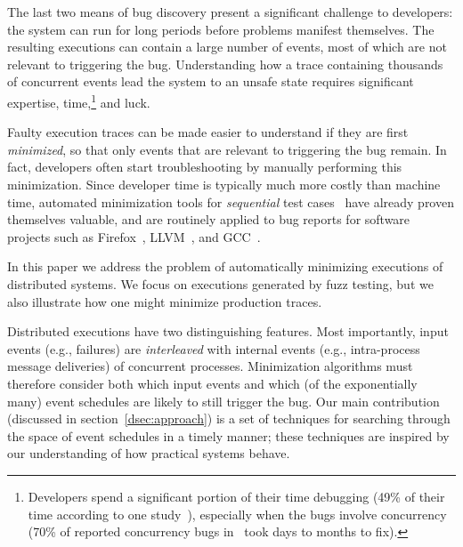 The last two means of bug discovery present a significant challenge to
developers: the system can run for
long periods before problems manifest themselves. The resulting executions
can contain a large number of events, most of which are not relevant to triggering the
bug. Understanding how a trace containing thousands of concurrent events lead
the system to an unsafe state requires significant expertise, time,\footnote{Developers spend a significant portion of their time
debugging (49\% of their time according to one
study~\cite{LaToza:2006:MMM:1134285.1134355}), especially when the bugs
involve concurrency (70\% of reported concurrency bugs
in~\cite{msoft_concurrency} took days to months to fix).}
and luck.


Faulty execution traces can be made %
easier to understand if they are first
{\em minimized}, so that only events that are relevant to triggering the bug remain.
In fact, developers often start troubleshooting by manually performing this minimization.
Since developer time is typically much more costly than machine time,
automated minimization tools for {\em sequential}
test
cases~\cite{claessen2000quickcheck,Zeller:2002:SIF:506201.506206,yang2011finding}
have already proven themselves valuable,
and are routinely applied to bug reports for software projects such as Firefox~\cite{firefox_reduction}, LLVM~\cite{bugpoint}, and GCC~\cite{gcc_reduction}.

In this paper we address the problem of automatically minimizing executions of distributed systems. We
focus on executions generated by fuzz testing, but we also
illustrate how one might minimize production traces.


Distributed executions have two distinguishing features. Most importantly, input events
(e.g., failures)
are {\em interleaved} with internal events (e.g., intra-process
message deliveries) of concurrent processes. Minimization algorithms must therefore consider both which
input events and which (of the exponentially many)
event schedules are likely to still trigger the bug. Our main contribution
(discussed in section~\ref{dsec:approach}) is a set of techniques for searching
through the space of event schedules in a timely manner; these techniques are inspired
by our understanding of how practical systems behave.

